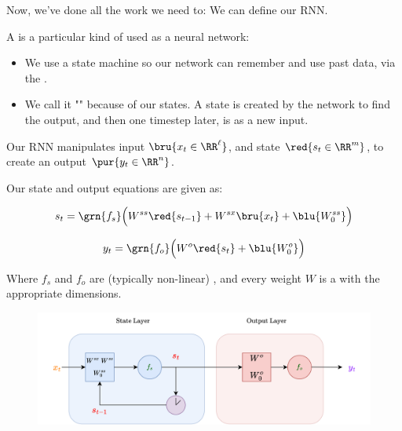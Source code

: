        Now, we've done all the work we need to: We can define our RNN.\\

        \begin{definition}
            A  is a particular kind of  used as a neural network:

            \begin{itemize}
                \item We use a state machine so our network can remember and use past data, via the .
                \item We call it "" because of our states. A state is created by the network to find the output, and then one timestep later, is  as a new input.
            \end{itemize}

            Our RNN manipulates input $\bru{x_t \in \RR^\ell}$, and state $\red{s_t \in \RR^m}$, to create an output $\pur{y_t \in \RR^n}$.

            Our state and output equations are given as:

            \begin{equation*}
                s_t = \grn{f_s} \Big( W^{ss}\red{s_{t-1}} + W^{sx}\bru{x_t} + \blu{W^{ss}_0} \Big)
            \end{equation*}

            \begin{equation*}
                y_t = \grn{f_o} \Big( W^o\red{s_t} + \blu{W^o_0} \Big)
            \end{equation*}

            Where $f_s$ and $f_o$ are (typically non-linear) , and every weight $W$ is a  with the appropriate dimensions.
        \end{definition}

        \begin{figure}[H]
            \centering
            \includegraphics[width=150mm,scale=0.4]{images/rnn_images/rnn_full.png}
        \end{figure}

